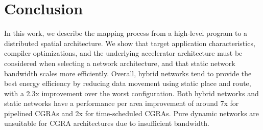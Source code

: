 \section{Conclusion}
\label{sec:conclusion}
In this work, we describe the mapping process from a high-level program to a distributed spatial architecture.
We show that target application characteristics, compiler optimizations, and the underlying accelerator
architecture must be considered when selecting a network architecture, and that static network bandwidth scales more efficiently.
Overall, hybrid networks tend to provide the best energy efficiency by reducing data movement
using static place and route, with a 2.3x improvement over the worst configuration. 
Both hybrid networks and static networks have a performance per area improvement of around 7x
for pipelined CGRAs and 2x for time-scheduled CGRAs.
Pure dynamic networks are unsuitable for CGRA architectures due to insufficient bandwidth.

